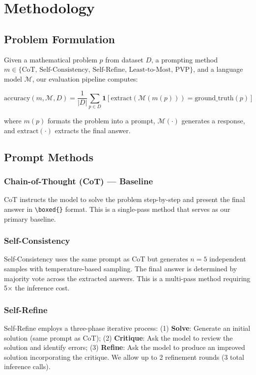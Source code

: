 \documentclass[conference]{IEEEtran}
\begin{document}
\section{Methodology}

\subsection{Problem Formulation}

Given a mathematical problem $p$ from dataset $D$, a prompting method $m \in \{\text{CoT, Self-Consistency, Self-Refine, Least-to-Most, PVP}\}$, and a language model $\mathcal{M}$, our evaluation pipeline computes:

\begin{equation}
\text{accuracy}(m, \mathcal{M}, D) = \frac{1}{|D|} \sum_{p \in D} \mathbf{1}[\text{extract}(\mathcal{M}(m(p))) = \text{ground\_truth}(p)]
\end{equation}

where $m(p)$ formats the problem into a prompt, $\mathcal{M}(\cdot)$ generates a response, and $\text{extract}(\cdot)$ extracts the final answer.

\subsection{Prompt Methods}

\subsubsection{Chain-of-Thought (CoT) --- Baseline}
CoT instructs the model to solve the problem step-by-step and present the final answer in \texttt{\textbackslash boxed\{\}} format. This is a single-pass method that serves as our primary baseline.

\subsubsection{Self-Consistency}
Self-Consistency uses the same prompt as CoT but generates $n=5$ independent samples with temperature-based sampling. The final answer is determined by majority vote across the extracted answers. This is a multi-pass method requiring 5$\times$ the inference cost.

\subsubsection{Self-Refine}
Self-Refine employs a three-phase iterative process: (1) \textbf{Solve}: Generate an initial solution (same prompt as CoT); (2) \textbf{Critique}: Ask the model to review the solution and identify errors; (3) \textbf{Refine}: Ask the model to produce an improved solution incorporating the critique. We allow up to 2 refinement rounds (3 total inference calls).
\end{document}
